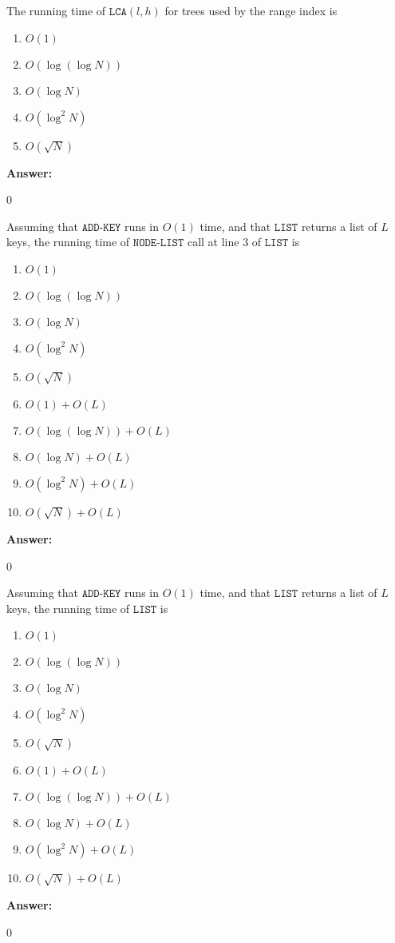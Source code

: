 \documentclass[12pt,twoside]{article}
\newcommand{\answer}{
 \par\medskip
 \textbf{Answer:}
}
\newcommand{\answerIr}{ \answer
0
}
\newcommand{\answerIs}{ \answer
0
}
\newcommand{\answerIt}{ \answer
0
}
\begin{document}
\begin{problems}
\begin{problemparts}
  \problempart {} The running time of $\texttt{LCA}(l,h)$ for trees
  used by the range index is
    \begin{enumerate}
      \item $O(1)$
      \item $O(\log(\log N))$
      \item $O(\log N)$
      \item $O(\log^2 N)$
      \item $O(\sqrt{N})$
    \end{enumerate}
\answerIr

  \problempart {} Assuming that $\texttt{ADD-KEY}$ runs in $O(1)$ time,
  and that $\texttt{LIST}$ returns a list of $L$ keys, the running time of
  $\texttt{NODE-LIST}$ call at line 3 of $\texttt{LIST}$ is
   \begin{enumerate}
      \item $O(1)$
      \item $O(\log(\log N))$
      \item $O(\log N)$
      \item $O(\log^2 N)$
      \item $O(\sqrt{N})$
      \item $O(1) + O(L)$
      \item $O(\log(\log N)) + O(L)$
      \item $O(\log N) + O(L)$
      \item $O(\log^2N) + O(L)$
      \item $O(\sqrt{N}) + O(L)$
    \end{enumerate}
\answerIs

  \problempart {} Assuming that $\texttt{ADD-KEY}$ runs in $O(1)$ time,
  and that $\texttt{LIST}$ returns a list of $L$ keys, the running time of
  $\texttt{LIST}$ is
    \begin{enumerate}
      \item $O(1)$
      \item $O(\log(\log N))$
      \item $O(\log N)$
      \item $O(\log^2 N)$
      \item $O(\sqrt{N})$
      \item $O(1) + O(L)$
      \item $O(\log(\log N)) + O(L)$
      \item $O(\log N) + O(L)$
      \item $O(\log^2N) + O(L)$
      \item $O(\sqrt{N}) + O(L)$
    \end{enumerate}
\answerIt
    

\end{problemparts}
\end{problems}
\end{document}
